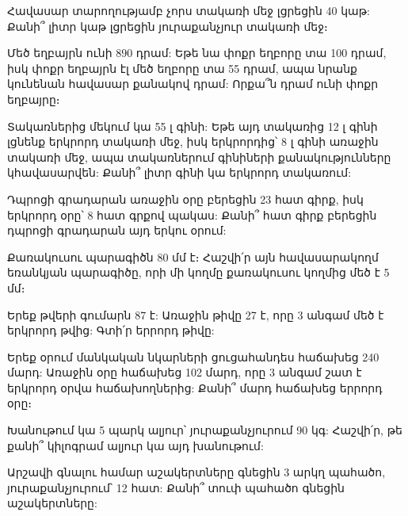 \problem
Հավասար տարողությամբ չորս տակառի մեջ լցրեցին 40 կաթ: 
Քանի՞ լիտր կաթ լցրեցին յուրաքանչյուր տակառի մեջ։

\problem
Մեծ եղբայրն ունի 890 դրամ: Եթե նա փոքր եղբորը տա 100 դրամ, 
իսկ փոքր եղբայրն էլ մեծ եղբորը տա 55 դրամ, ապա նրանք կունենան 
հավասար քանակով դրամ: Որքա՞ն դրամ ունի փոքր եղբայրը։

\problem
Տակառներից մեկում կա 55 լ գինի: Եթե այդ տակառից 12 լ 
գինի լցնենք երկրորդ տակառի մեջ, իսկ երկրորդից՝ 8 լ գինի 
առաջին տակառի մեջ, ապա տակառներում գինիների քանակությունները 
կհավասարվեն: Քանի՞ լիտր գինի կա երկրորդ տակառում:

\problem
Դպրոցի գրադարան առաջին օրը բերեցին 23 հատ գիրք, իսկ երկրորդ 
օրը՝ 8 հատ գրքով պակաս: Քանի՞ հատ գիրք բերեցին դպրոցի գրադարան 
այդ երկու օրում:

\problem
Քառակուսու պարագիծն 80 մմ է։ Հաշվի՛ր այն հավասարակողմ եռանկյան
պարագիծը, որի մի կողմը քառակուսու կողմից մեծ է 5 մմ։

\problem
Երեք թվերի գումարն 87 է: Առաջին թիվը 27 է, որը 3 անգամ մեծ է 
երկրորդ թվից: Գտի՛ր երրորդ թիվը:

\problem
Երեք օրում մանկական նկարների ցուցահանդես հաճախեց 240 մարդ: Առաջին 
օրը հաճախեց 102 մարդ, որը 3 անգամ շատ է երկրորդ օրվա հաճախողներից: 
Քանի՞ մարդ հաճախեց երրորդ օրը։

\problem
Խանութում կա 5 պարկ ալյուր՝ յուրաքանչյուրում 90 կգ: Հաշվի՛ր, թե 
քանի՞ կիլոգրամ ալյուր կա այդ խանութում:

\problem
Արշավի գնալու համար աշակերտները գնեցին 3 արկղ պահածո, յուրաքանչյուրում՝ 
12 հատ: Քանի՞ տուփ պահածո գնեցին աշակերտները:



\bye
